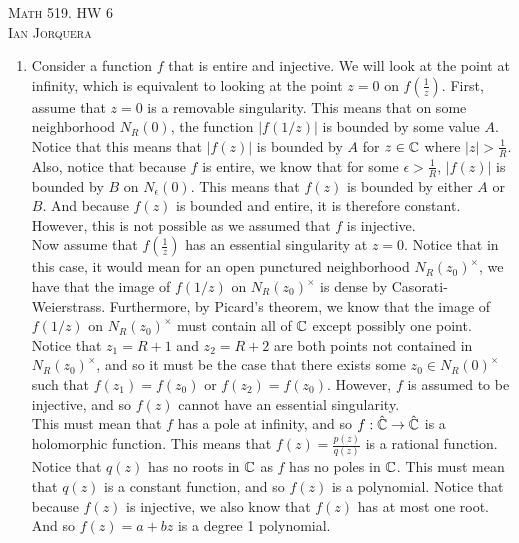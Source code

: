 \documentclass[12pt]{amsart}
\begin{document}
\begin{center}
    \textsc{Math 519. HW 6\\ Ian Jorquera}
\end{center}
\vspace{1em}

\begin{enumerate}
\item Consider a function $f$ that is entire and injective. We will look at the point at infinity, which is equivalent to looking at the point $z=0$ on $f(\frac{1}{z})$. First, assume that $z=0$ is a removable singularity. This means that on some neighborhood $N_R(0)$, the function $|f(1/z)|$ is bounded by some value $A$. Notice that this means that $|f(z)|$ is bounded by $A$ for $z\in \mathbb{C}$ where $|z|>\frac{1}{R}$. Also, notice that because $f$ is entire, we know that for some $\epsilon>\frac{1}{R}$, $|f(z)|$ is bounded by $B$ on $N_\epsilon(0)$. This means that $f(z)$ is bounded by either $A$ or $B$. And because $f(z)$ is bounded and entire, it is therefore constant. However, this is not possible as we assumed that $f$ is injective.\\

Now assume that $f(\frac{1}{z})$ has an essential singularity at $z=0$. Notice that in this case, it would mean for an open punctured neighborhood $N_R(z_0)^\times$, we have that the image of $f(1/z)$ on $N_R(z_0)^\times$ is dense by Casorati-Weierstrass. Furthermore, by Picard's theorem, we know that the image of $f(1/z)$ on $N_R(z_0)^\times$ must contain all of $\mathbb{C}$ except possibly one point. Notice that $z_1=R+1$ and $z_2=R+2$ are both points not contained in $N_R(z_0)^\times$, and so it must be the case that there exists some $z_0\in N_R(0)^\times$ such that $f(z_1)=f(z_0)$ or $f(z_2)=f(z_0)$. However, $f$ is assumed to be injective, and so $f(z)$ cannot have an essential singularity.\\

This must mean that $f$ has a pole at infinity, and so $f:\hat{\mathbb{C}}\rightarrow\hat{\mathbb{C}}$ is a holomorphic function. This means that $f(z)=\frac{p(z)}{q(z)}$ is a rational function. Notice that $q(z)$ has no roots in $\mathbb{C}$ as $f$ has no poles in $\mathbb{C}$. This must mean that $q(z)$ is a constant function, and so $f(z)$ is a polynomial. Notice that because $f(z)$ is injective, we also know that $f(z)$ has at most one root. And so $f(z)=a+bz$ is a degree 1 polynomial.\\ 



\end{enumerate}
\end{document}
